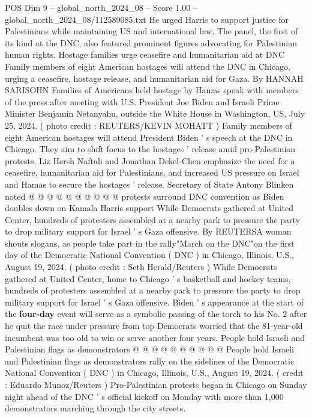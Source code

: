 \begin{textsample}{POS Dim 9 – global\_north\_2024\_08 – Score 1.00 – global\_north\_2024\_08/112589085.txt}  \label{ex:f9_pos_199}
He urged Harris to support justice for Palestinians while maintaining US and international law.
The panel, the first of its kind at the DNC, also featured prominent figures advocating for Palestinian human rights.
Hostage families urge ceasefire and humanitarian aid at DNC Family members of eight American hostages will attend the DNC in Chicago, urging a ceasefire, hostage release, and humanitarian aid for Gaza.
By HANNAH SARISOHN Families of Americans held hostage by Hamas speak with members of the press after meeting with U.S.
President Joe Biden and Israeli Prime Minister Benjamin Netanyahu, outside the White House in Washington, US, July 25, 2024. ( photo credit : REUTERS/KEVIN MOHATT ) Family members of eight American hostages will attend President Biden ' s speech at the DNC in Chicago.
They aim to shift focus to the hostages ' release amid pro-Palestinian protests.
Liz Hersh Naftali and Jonathan Dekel-Chen emphasize the need for a ceasefire, humanitarian aid for Palestinians, and increased US pressure on Israel and Hamas to secure the hostages ' release.
Secretary of State Antony Blinken noted @ @ @ @ @ @ @ @ @ @ protests surround DNC convention as Biden doubles down on Kamala Harris support While Democrats gathered at United Center, hundreds of protesters assembled at a nearby park to pressure the party to drop military support for Israel ' s Gaza offensive.
By REUTERSA woman shouts slogans, as people take part in the rally"March on the DNC"on the first day of the Democratic National Convention ( DNC ) in Chicago, Illinois, U.S., August 19, 2024. ( photo credit : Seth Herald/Reuters ) While Democrats gathered at United Center, home to Chicago ' s basketball and hockey teams, hundreds of protesters assembled at a nearby park to pressure the party to drop military support for Israel ' s Gaza offensive.
Biden ' s appearance at the start of the \textbf{four-day} event will serve as a symbolic passing of the torch to his No. 2 after he quit the race under pressure from top Democrats worried that the 81-year-old incumbent was too old to win or serve another four years.
People hold Israeli and Palestinian flags as demonstrators @ @ @ @ @ @ @ @ @ @ People hold Israeli and Palestinian flags as demonstrators rally on the sidelines of the Democratic National Convention ( DNC ) in Chicago, Illinois, U.S., August 19, 2024. ( credit : Eduardo Munoz/Reuters ) Pro-Palestinian protests began in Chicago on Sunday night ahead of the DNC ' s official kickoff on Monday with more than 1,000 demonstrators marching through the city streets.

\end{textsample}

